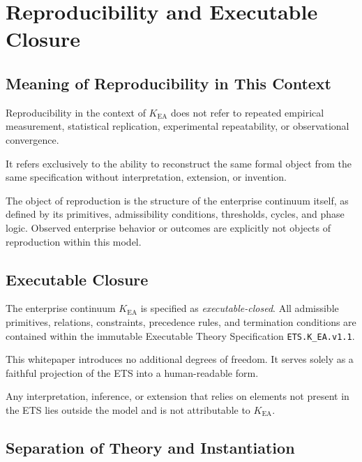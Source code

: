 
\section{Reproducibility and Executable Closure}

\subsection{Meaning of Reproducibility in This Context}

Reproducibility in the context of $K_{\mathrm{EA}}$ does not refer to
repeated empirical measurement, statistical replication, experimental
repeatability, or observational convergence.

It refers exclusively to the ability to reconstruct the same formal
object from the same specification without interpretation, extension, or
invention.

The object of reproduction is the structure of the enterprise continuum
itself, as defined by its primitives, admissibility conditions,
thresholds, cycles, and phase logic.
Observed enterprise behavior or outcomes are explicitly not objects of
reproduction within this model.

\subsection{Executable Closure}

The enterprise continuum $K_{\mathrm{EA}}$ is specified as
\emph{executable-closed}.
All admissible primitives, relations, constraints, precedence rules, and
termination conditions are contained within the immutable Executable
Theory Specification \texttt{ETS.K\_EA.v1.1}.

This whitepaper introduces no additional degrees of freedom.
It serves solely as a faithful projection of the ETS into a
human-readable form.

Any interpretation, inference, or extension that relies on elements not
present in the ETS lies outside the model and is not attributable to
$K_{\mathrm{EA}}$.

\subsection{Separation of Theory and Instantiation}

